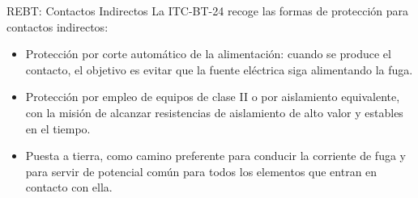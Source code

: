 \documentclass[xcolor={usenames,svgnames,dvipsnames}]{beamer}
\begin{document}
\begin{frame}[label={sec:orge780617}]{REBT: Contactos Indirectos}
La ITC-BT-24 recoge las formas de protección para contactos
indirectos:

\begin{itemize}
\item Protección por \alert{corte automático de la alimentación}: cuando se
produce el contacto, el objetivo es evitar que la fuente eléctrica
siga alimentando la fuga.

\item Protección por empleo de \alert{equipos de clase II o por aislamiento
equivalente}, con la misión de alcanzar resistencias de aislamiento
de alto valor y estables en el tiempo.

\item \alert{Puesta a tierra}, como camino preferente para conducir la corriente
de fuga y para servir de potencial común para todos los elementos que
entran en contacto con ella.
\end{itemize}
\end{frame}
\end{document}
